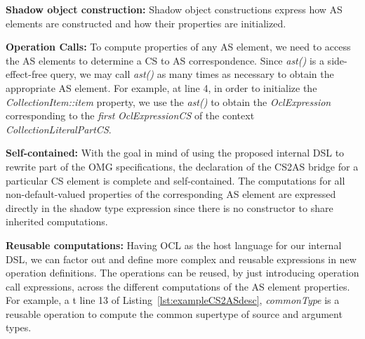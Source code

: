 \documentclass{llncs}
\begin{document}
\textbf{Shadow object construction:} Shadow object constructions express how AS elements are constructed and how their properties are initialized. %

\textbf{Operation Calls:} To compute properties of any AS element, we  need to access the AS elements to determine a CS to AS correspondence.
Since \emph{ast()} is a side-effect-free query, we may call  \emph{ast()} as many times as necessary to obtain the appropriate AS element.
For example, at line 4, in order to initialize the \emph{CollectionItem::item} property, we use the \emph{ast()} to obtain the \emph{OclExpression} corresponding to the \emph{first} \emph{OclExpressionCS} of the context \emph{CollectionLiteralPartCS}.

\textbf{Self-contained:} With the goal in mind of using the proposed internal DSL to rewrite part of the OMG specifications, the declaration of the CS2AS bridge for a particular CS element is complete and self-contained. The computations for all non-default-valued properties of the corresponding AS element are expressed directly in the shadow type expression since there is no constructor to share inherited computations.

\textbf{Reusable computations:} Having OCL as the host language for our internal DSL, we can factor out and define more complex and reusable expressions in new operation definitions. The operations can be reused, by just introducing operation call expressions, across the different computations of the AS element properties. For example, a	t line 13 of Listing~\ref{lst:exampleCS2ASdesc}, \emph{commonType} is a reusable operation
 to compute the common supertype of source and argument types.

\end{document}
